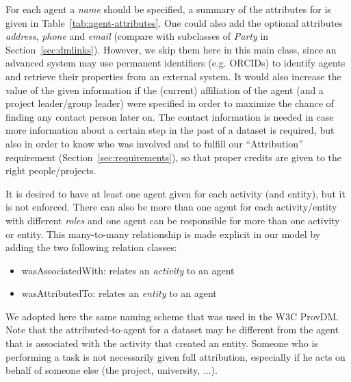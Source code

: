 For each agent a \emph{name} should be specified, a summary of the attributes for  is given in Table~\ref{tab:agent-attributes}.
One could also add the optional attributes \emph{address}, \emph{phone} and \emph{email} (compare with subclasses of \emph{Party} in Section~\ref{sec:dmlinks}). However, we skip them here in this main class, since an advanced system may use permanent identifiers (e.g. ORCIDs) to identify agents and retrieve their properties from an external system.
It would also increase the value of the given
information if the (current) affiliation of the agent (and a project leader/group
leader) were specified in order to maximize the chance of finding any contact 
person later on. 
The contact information is needed in case more information about a certain step in the past of a dataset is required,
but also in order
to know who was involved and to fulfill our ``Attribution'' requirement 
(Section~\ref{sec:requirements}), so that proper credits are given to the right 
people/projects. 



It is desired to have at least one agent given for each activity (and entity), but it
is not enforced.
There can also be more than one agent for each activity/entity with different \emph{roles} 
and one agent can be responsible for more than one activity or entity. This 
many-to-many relationship is made explicit in our model by adding the two
following relation classes:

\begin{itemize}
\item wasAssociatedWith: relates an \emph{activity} to an agent
\item wasAttributedTo: relates an \emph{entity} to an agent
\end{itemize}

We adopted here the same naming scheme that was used in the W3C ProvDM.
Note that the attributed-to-agent for a dataset may be different from the 
agent that is associated with the activity that created an entity.
Someone who is performing a task is not necessarily given full attribution, 
especially if he acts on behalf of someone else (the project, university, ...).


